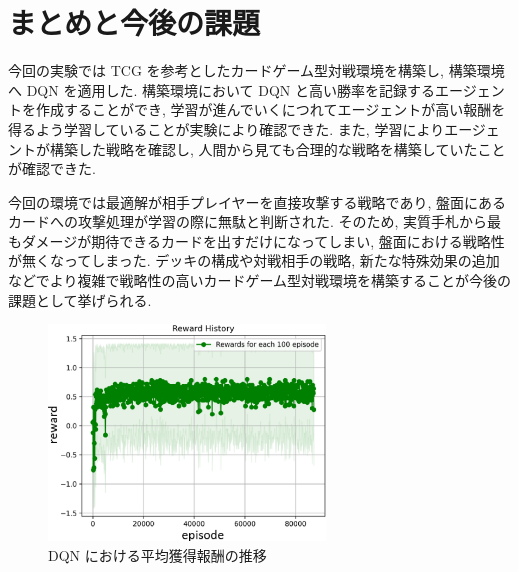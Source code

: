 \documentclass[twocolumn]{jarticle}
\begin{document}
\section{まとめと今後の課題}
今回の実験では TCG を参考としたカードゲーム型対戦環境を構築し, 構築環境へ DQN を適用した. 構築環境において DQN と高い勝率を記録するエージェントを作成することができ, 学習が進んでいくにつれてエージェントが高い報酬を得るよう学習していることが実験により確認できた. また, 学習によりエージェントが構築した戦略を確認し, 人間から見ても合理的な戦略を構築していたことが確認できた.
\par
今回の環境では最適解が相手プレイヤーを直接攻撃する戦略であり, 盤面にあるカードへの攻撃処理が学習の際に無駄と判断された. そのため, 実質手札から最もダメージが期待できるカードを出すだけになってしまい, 盤面における戦略性が無くなってしまった. デッキの構成や対戦相手の戦略, 新たな特殊効果の追加などでより複雑で戦略性の高いカードゲーム型対戦環境を構築することが今後の課題として挙げられる.

\begin{figure}[t]
  \centering
  \small
  \includegraphics[width=73.5mm]{assets/DQN_update.eps}
  \caption{DQN における平均獲得報酬の推移}
  \label{fig:DQNresult}
\end{figure}






\end{document}
